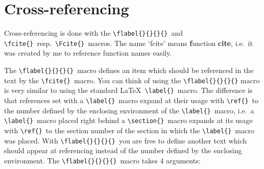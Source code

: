 \section{Cross-referencing}
%
Cross-referencing is done with the \verb|\flabel{}{}{}{}|\ and
\verb|\fcite{}|\ resp.\ \verb|\Fcite{}|\ macros.
The name `fcite' means \textbf{f}unction \textbf{cite}, i.e.\ it
was created by me to reference function names easily.
%
\par{}The \verb|\flabel{}{}{}{}|\ macro defines an item which should be
referenced in the text by the \verb|\fcite{}|\ macro. You can think of
using the \verb|\flabel{}{}{}{}| macro is very similar to using the
standard \LaTeX\ \verb|\label{}|\ macro. The difference is that
references set with a \verb|\label{}|\ macro expand at their usage
with \verb|\ref{}|\ to the number defined by the enclosing environment
of the \verb|\label{}|\ macro, i.e.\ a \verb|\label{}|\ macro placed
right behind a \verb|\section{}|\ macro expands at its usage with
\verb|\ref{}|\ to the section number of the section in which the
\verb|\label{}|\ macro was placed. With \verb|\flabel{}{}{}{}|\ you are
free to define another text which should appear at referencing instead
of the number defined by the enclosing environment. The
\verb|\flabel{}{}{}{}|\ macro takes 4 arguments:

